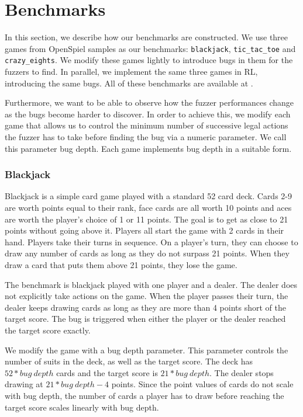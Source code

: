 \section{Benchmarks}
In this section, we describe how our benchmarks are constructed.
We use three games from OpenSpiel samples as our benchmarks: \texttt{blackjack}, \texttt{tic\_tac\_toe} and \texttt{crazy\_eights}.
We modify these games lightly to introduce bugs in them for the fuzzers to find.
In parallel, we implement the same three games in RL, introducing the same bugs.
All of these benchmarks are available at \cite{benchmarks}.

Furthermore, we want to be able to observe how the fuzzer performances change as the bugs become harder to discover.
In order to achieve this, we modify each game that allows us to control the minimum number of successive legal actions the fuzzer has to take before finding the bug
via a numeric parameter.
We call this parameter bug depth. Each game implements bug depth in a suitable form.

\subsubsection{Blackjack}
Blackjack is a simple card game played with a standard 52 card deck.
Cards 2-9 are worth points equal to their rank, face cards are all worth 10 points and aces are worth the player's choice of 1 or 11 points.
The goal is to get as close to 21 points without going above it.
Players all start the game with 2 cards in their hand.
Players take their turns in sequence. On a player's turn, they can choose to draw any number of cards as long as they do not surpass 21 points.
When they draw a card that puts them above 21 points, they lose the game.

The benchmark is blackjack played with one player and a dealer. The dealer does not explicitly take actions on the game.
When the player passes their turn, the dealer keeps drawing cards as long as they are more than 4 points short of the target score.
The bug is triggered when either the player or the dealer reached the target score exactly.

We modify the game with a bug depth parameter. This parameter controls the number of suits in the deck, as well as the target score.
The deck has $52 * bug\ depth$ cards and the target score is $21 * bug\ depth$. The dealer stops drawing at $21 * bug\ depth - 4$ points.
Since the point values of cards do not scale with bug depth, the number of cards a player has to draw before reaching the target score scales linearly with bug depth. 

